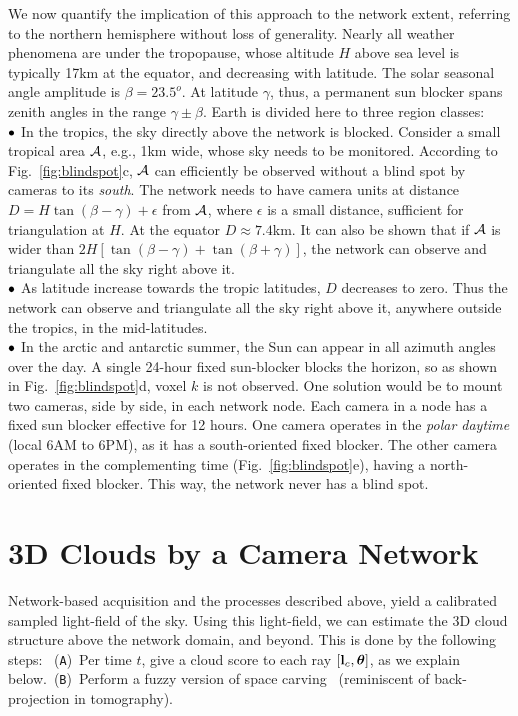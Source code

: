 \documentclass[runningheads]{llncs}
\begin{document}
We now quantify the implication of this approach to the network extent, referring to the northern hemisphere without loss of generality.
Nearly all weather phenomena are under the tropopause, whose altitude $H$ above sea level is typically 17km at the equator, and decreasing with latitude. The solar seasonal angle amplitude is $\beta=23.5^o$. At latitude $\gamma$, thus, a permanent sun blocker spans zenith angles in the range $\gamma\pm\beta$. Earth is divided here to three region classes:\\
  ${\bf \bullet}$ In the tropics, the sky directly above the network is blocked. Consider
  a small tropical area ${\cal A}$, e.g., 1km wide, whose sky needs to be monitored. According to Fig.~\ref{fig:blindspot}c, ${\cal A}$ can efficiently be observed without
  a blind spot by cameras to its {\em south}. The network needs to have camera units at distance  $D=H\tan(\beta-\gamma)+\epsilon$ from ${\cal A}$, where $\epsilon$ is a small distance, sufficient for triangulation at $H$. At the equator $D\approx7.4$km.
  It can also be shown that if ${\cal A}$ is wider than $2H[\tan(\beta-\gamma)+\tan(\beta+\gamma)]$, the network can observe and triangulate all the sky right above it.\\
${\bf \bullet}$  As latitude increase towards the tropic latitudes, $D$ decreases to zero. Thus the network can observe and triangulate all the sky right above it, anywhere outside the tropics, in the mid-latitudes.\\
  ${\bf \bullet}$ In the arctic and antarctic summer, the Sun can appear in all azimuth angles over the day. A single 24-hour fixed sun-blocker blocks the horizon,  so as shown in Fig.~\ref{fig:blindspot}d, voxel $k$ is not observed. One solution would be to mount two cameras, side by side, in each network node. Each camera in a node has a fixed sun blocker effective for 12 hours. One camera operates in the {\em polar daytime} (local 6AM to 6PM), as it has a south-oriented fixed blocker. The other camera operates in the complementing time (Fig.~\ref{fig:blindspot}e), having a north-oriented fixed blocker. This way, the network never has a blind spot.


\section{3D Clouds by a Camera Network}
\label{sec:3Dc}

Network-based acquisition and the processes described above, yield a calibrated sampled light-field of the sky. Using this light-field, we can estimate the 3D cloud structure above the network domain, and beyond. This is done by the following steps:~ %
({\tt A})~Per time $t$, give a {\rm cloud score} to each ray $[{\bf l}_c,{\bm \theta}]$, as we explain below.~({\tt B})~Perform a fuzzy version of space carving~\cite{Kutulakos2000,Ihrke2004} (reminiscent of back-projection in tomography).
\end{document}
